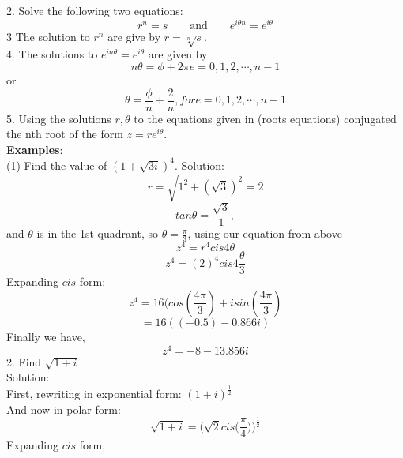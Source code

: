 \documentclass[a4paper, 12pt]{report}
\begin{document}
{2. Solve the following two equations:
\begin{equation*}
r^n = s \qquad \text{and} \qquad e^{i\theta n} = e^{i\theta}
\end{equation*}
3 The solution to $r^n$ are give by $r = \sqrt[n]{s}$.\\
4. The solutions to $e^{in\theta} = e^{i\theta}$ are given by
\begin{equation*}
n\theta = \phi + 2\pi e = 0, 1, 2,\cdots, n-1
\end{equation*}
or
\begin{equation*}
\theta = \frac{\phi}{n} + \frac{2}{n}, for e = 0, 1, 2,\cdots, n-1 
\end{equation*}
5. Using the solutions $r, \theta$ to the equations given in (roots equations) conjugated the nth root of the form $z = re^{i\theta}$.\\
\textbf{Examples}:\\
(1) Find the value of $(1 + \sqrt{3i})^4$.
Solution:
\begin{equation*}
r = \sqrt{1^2 + (\sqrt{3})^2} = 2
\end{equation*}
\begin{equation*}
tan\theta = \frac{\sqrt{3}}{1},
\end{equation*}
and $\theta$ is in the 1st quadrant, so $\theta = \frac{\pi}{3}$, using our equation from above
\begin{equation*}
z^4 = r^4cis4\theta
\end{equation*}
\begin{equation*}
z^4 = (2)^4cis4\frac{\theta}{3}
\end{equation*}
Expanding $cis$ form:
\begin{equation*}
z^4 = 16(cos(\frac{4\pi}{3}) + isin(\frac{4\pi}{3})
\end{equation*}
\begin{equation*}
= 16((-0.5) - 0.866i)
\end{equation*}
Finally we have,
\begin{equation*}
z^4 = -8 - 13.856i
\end{equation*}
2. Find $\sqrt{1 + i}$.\\
Solution:\\
First, rewriting in exponential form: $(1 + i)^{\frac{1}{2}}$\\
And now in polar form:
\begin{equation*}
\sqrt{1 + i} = \bigg(\sqrt{2}cis\bigg(\frac{\pi}{4}\bigg)\bigg)^{\frac{1}{2}}
\end{equation*}
Expanding $cis$ form,
}
\end{document}
